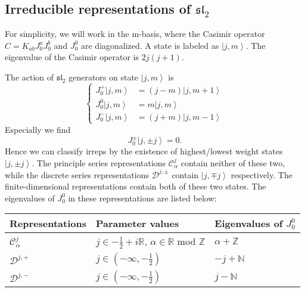 \documentclass[10pt,a4paper]{article}
\numberwithin{equation}{section}
\newcommand{\ket}[1]{\left| #1 \right\rangle}
\begin{document}
\subsection{Irreducible representations of \texorpdfstring{$\mathfrak{sl}_{2}$}{Lg}}
For simplicity, we will work in the m-basis, where the Casimir operator $C=K_{ab}J^{a}_{0}J^{b}_{0}$ and $J^{0}_{0}$ are diagonalized. 
A state is labeled as $\ket{j,m}$. The eigenvalue of the Casimir operator is $2j(j+1)$.\\
\par The action of $\mathfrak{sl}_{2}$ generators on state $\ket{j,m}$ is 
\begin{equation}
    \left\{
        \begin{aligned}
            J^{+}_{0} \ket{j,m} & = (j-m) \ket{j,m+1}\\
            J^{0}_{0} \ket{j,m} & = m \ket{j,m}\\
            J^{-}_{0} \ket{j,m} & = (j+m) \ket{j,m-1}
        \end{aligned}
    \right.
\end{equation}
Especially we find 
\begin{equation}
    J^{\pm}_{0} \ket{j,\pm j} = 0.
\end{equation}
Hence we can classify irreps by the existence of highest/lowest weight states $\ket{j,\pm j}$\cite{ribault2022conformalfieldtheoryplane}. The principle series representations
$\mathcal{C}^{j}_{\alpha}$ contain neither of these two, while the discrete series representations $\mathcal{D}^{j,\pm}$ contain
$\ket{j,\mp j}$ respectively. The finite-dimensional representations contain both of these two states. The eigenvalues of $J^{0}_{0}$ in these 
representations are listed below:

\begin{center}
    \begin{tabular}{|l|l|l|}
        \hline
        Representations&Parameter values&Eigenvalues of $J^{0}_{0}$\\
        \hline
        $\mathcal{C}^{j}_{\alpha}$ & $j \in -\frac{1}{2} + i \mathbb{R} $, $\alpha \in \mathbb{R}$ mod $\mathbb{Z}$& $\alpha + \mathbb{Z}$\\
        $\mathcal{D}^{j,+}$ & $j \in (-\infty,-\frac{1}{2}) $& $-j + \mathbb{N}$\\
        $\mathcal{D}^{j,-}$ & $j \in (-\infty,-\frac{1}{2}) $& $j - \mathbb{N}$\\
        \hline
    \end{tabular}
\end{center}
\end{document}
